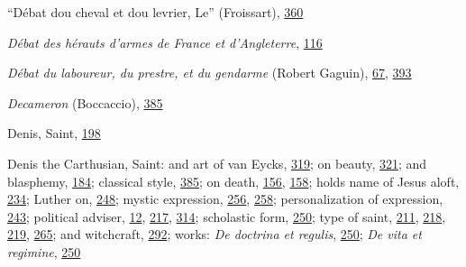 ``Débat dou cheval et dou levrier, Le'' (Froissart),
\protect\hyperlink{21_Chapter_Thirteen__IMAGE_AND_WORD.xhtmlux5cux23page_360}{360}

\emph{Débat des hérauts d'armes de France et d'Angleterre},
\protect\hyperlink{10_Chapter_Three__THE_HEROIC_DREAM.xhtmlux5cux23page_116}{116}

\emph{Débat du laboureur, du prestre, et du gendarme} (Robert Gaguin),
\protect\hyperlink{10_Chapter_Three__THE_HEROIC_DREAM.xhtmlux5cux23page_67}{67},
\protect\hyperlink{22_Chapter_Fourteen__THE_COMING_OF.xhtmlux5cux23page_393}{393}

\emph{Decameron} (Boccaccio),
\protect\hyperlink{22_Chapter_Fourteen__THE_COMING_OF.xhtmlux5cux23page_385}{385}

Denis, Saint,
\protect\hyperlink{13_Chapter_Six__THE_DEPICTION_OF_TH.xhtmlux5cux23page_198}{198}

Denis the Carthusian, Saint: and art of van Eycks,
\protect\hyperlink{20_ILLUSTRATIONS_FOLLOW_PAGE.xhtmlux5cux23page_319}{319};
on beauty,
\protect\hyperlink{20_ILLUSTRATIONS_FOLLOW_PAGE.xhtmlux5cux23page_321}{321};
and blasphemy,
\protect\hyperlink{13_Chapter_Six__THE_DEPICTION_OF_TH.xhtmlux5cux23page_184}{184};
classical style,
\protect\hyperlink{22_Chapter_Fourteen__THE_COMING_OF.xhtmlux5cux23page_385}{385};
on death,
\protect\hyperlink{12_Chapter_Five__THE_VISION_OF_DEAT.xhtmlux5cux23page_156}{156},
\protect\hyperlink{12_Chapter_Five__THE_VISION_OF_DEAT.xhtmlux5cux23page_158}{158};
holds name of Jesus aloft,
\protect\hyperlink{16_Chapter_Nine__THE_DECLINE_OF_SYM.xhtmlux5cux23page_234}{234};
Luther on,
\protect\hyperlink{16_Chapter_Nine__THE_DECLINE_OF_SYM.xhtmlux5cux23page_248}{248};
mystic expression,
\protect\hyperlink{17_Chapter_Ten__THE_FAILURE_OF_IMAG.xhtmlux5cux23page_256}{256},
\protect\hyperlink{17_Chapter_Ten__THE_FAILURE_OF_IMAG.xhtmlux5cux23page_258}{258};
personalization of expression,
\protect\hyperlink{16_Chapter_Nine__THE_DECLINE_OF_SYM.xhtmlux5cux23page_243}{243};
political adviser,
\protect\hyperlink{08_Chapter_One__THE_PASSIONATE_INTE.xhtmlux5cux23page_12}{12},
\protect\hyperlink{14_Chapter_Seven__THE_PIOUS_PERSONA.xhtmlux5cux23page_217}{217},
\protect\hyperlink{20_ILLUSTRATIONS_FOLLOW_PAGE.xhtmlux5cux23page_314}{314};
scholastic form,
\protect\hyperlink{17_Chapter_Ten__THE_FAILURE_OF_IMAG.xhtmlux5cux23page_250}{250};
type of saint,
\protect\hyperlink{14_Chapter_Seven__THE_PIOUS_PERSONA.xhtmlux5cux23page_211}{211},
\protect\hyperlink{14_Chapter_Seven__THE_PIOUS_PERSONA.xhtmlux5cux23page_218}{218},
\protect\hyperlink{14_Chapter_Seven__THE_PIOUS_PERSONA.xhtmlux5cux23page_219}{219},
\protect\hyperlink{17_Chapter_Ten__THE_FAILURE_OF_IMAG.xhtmlux5cux23page_265}{265};
and witchcraft,
\protect\hyperlink{18_Chapter_Eleven__THE_FORMS_OF_THO.xhtmlux5cux23page_292}{292};
works: \emph{De doctrina et regulis},
\protect\hyperlink{17_Chapter_Ten__THE_FAILURE_OF_IMAG.xhtmlux5cux23page_250}{250};
\emph{De vita et regimine},
\protect\hyperlink{17_Chapter_Ten__THE_FAILURE_OF_IMAG.xhtmlux5cux23page_250}{250}

